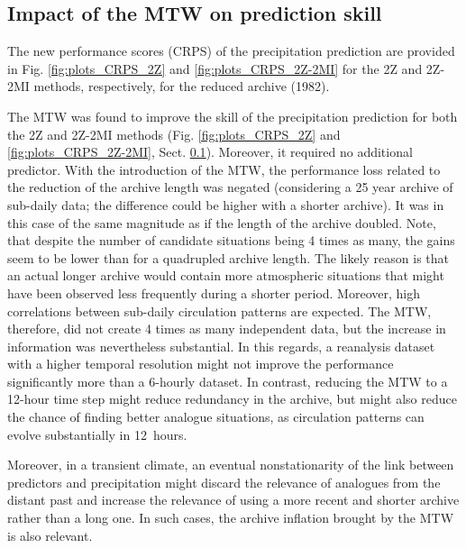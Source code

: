\documentclass[hess, manuscript]{copernicus}
\begin{document}
	
	\subsection{Impact of the MTW on prediction skill}
	\label{sec:influence_scores}
	
	The new performance scores (CRPS) of the precipitation prediction are provided in Fig. \ref{fig:plots_CRPS_2Z} and \ref{fig:plots_CRPS_2Z-2MI} for the 2Z and 2Z-2MI methods, respectively, for the reduced archive (1982). 
	
	
	
	
	The MTW was found to improve the skill of the precipitation prediction for both the 2Z and 2Z-2MI methods (Fig. \ref{fig:plots_CRPS_2Z} and \ref{fig:plots_CRPS_2Z-2MI}, Sect. \ref{sec:influence_scores}). Moreover, it required no additional predictor. With the introduction of the MTW, the performance loss related to the reduction of the archive length was negated (considering a 25 year archive of sub-daily data; the difference could be higher with a shorter archive). It was in this case of the same magnitude as if the length of the archive doubled. Note, that despite the number of candidate situations being 4 times as many, the gains seem to be lower than for a quadrupled archive length. The likely reason is that an actual longer archive would contain more atmospheric situations that might have been observed less frequently during a shorter period. Moreover, high correlations between sub-daily circulation patterns are expected. The MTW, therefore, did not create 4 times as many independent data, but the increase in information was nevertheless substantial. In this regards, a reanalysis dataset with a higher temporal resolution might not improve the performance significantly more than a 6-hourly dataset. In contrast, reducing the MTW to a 12-hour time step might reduce redundancy in the archive, but might also reduce the chance of finding better analogue situations, as circulation patterns can evolve substantially in 12~hours.
	
	Moreover, in a transient climate, an eventual nonstationarity of the link between predictors and precipitation might discard the relevance of analogues from the distant past and increase the relevance of using a more recent and shorter archive rather than a long one. In such cases, the archive inflation brought by the MTW is also relevant.
	
\end{document}
